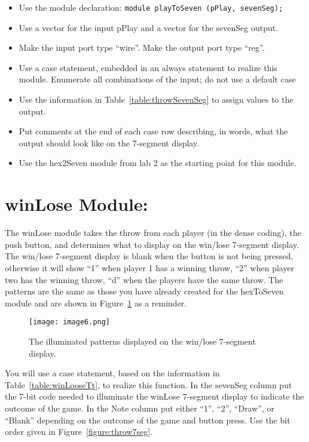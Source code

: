 \begin{itemize}
\item
  Use the module declaration: \verb+module playToSeven (pPlay, sevenSeg);+
\item
  Use a vector for the input pPlay and a vector for the sevenSeg output.
\item
  Make the input port type ``wire''. Make the output port type ``reg''.
\item
  Use a case statement, embedded in an always statement to realize this
  module. Enumerate all combinations of the input; do not use a default
  case
\item
  Use the information in Table~\ref{table:throwSevenSeg} to assign values to the output.
\item
  Put comments at the end of each case row describing, in words, what
  the output should look like on the 7-segment display.
\item
  Use the hex2Seven module from lab 2 as the starting point for this
  module.
\end{itemize}

\hypertarget{winlose-module}{%
\section{winLose Module:}
\label{winlose-module}}

The winLose module takes the throw from each player (in the dense
coding), the push button, and determines what to display on the win/lose
7-segment display. The win/lose 7-segment display is blank when the
button is not being pressed, otherwise it will show ``1'' when player 1
has a winning throw, ``2'' when player two has the winning throw, ``d''
when the players have the same throw. The patterns are the same as those
you have already created for the hexToSeven module and are shown in
Figure~\ref{fig:winLose7seg} as a reminder.

\begin{figure}[ht]
\texttt{[image:  image6.png]}
\caption{The illuminated patterns displayed on the win/lose 7-segment display.}
\label{fig:winLose7seg}
\end{figure}

You will use a case statement, based on the information in Table~\ref{table:winLooseTt}, to
realize this function. In the sevenSeg column put the 7-bit code needed
to illuminate the winLose 7-segment display to indicate the outcome of
the game. In the Note column put either ``1'', ``2'', ``Draw'', or
``Blank'' depending on the outcome of the game and button press. Use the
bit order given in Figure~\ref{figure:throw7seg}.

